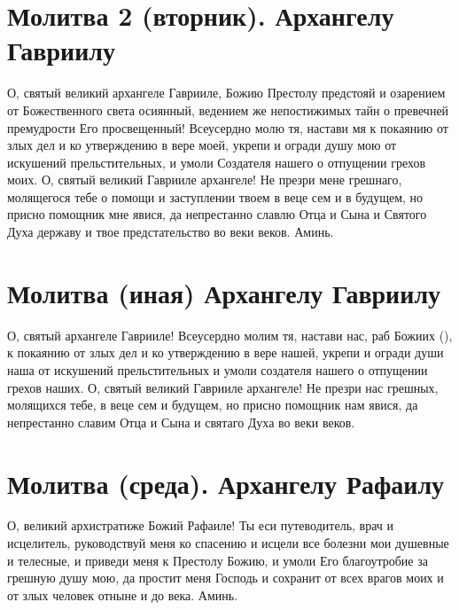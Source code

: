 \section{Молитва 2 (вторник).    Архангелу Гавриилу}\begin{mymulticols}
 


О, святый великий архангеле Гаврииле, Божию Престолу предстояй и озарением от Божественного света осиянный, ведением же непостижимых тайн о превечней премудрости Его просвещенный! Всеусердно молю тя, настави мя к покаянию от злых дел и ко утверждению в вере моей, укрепи и огради душу мою от искушений прельстительных, и умоли Создателя нашего о отпущении грехов моих. О, святый великий Гаврииле архангеле! Не презри мене грешнаго, молящегося тебе о помощи и заступлении твоем в веце сем и в будущем, но присно помощник мне явися, да непрестанно славлю Отца и Сына и Святого Духа державу и твое предстательство во веки веков. Аминь.


\end{mymulticols}

\section{Молитва (иная) Архангелу Гавриилу}\begin{mymulticols}
 


О, святый архангеле Гаврииле! Всеусердно молим тя, настави нас, раб Божиих (), к покаянию от злых дел и ко утверждению в вере нашей, укрепи и огради души наша от искушений прельстительных и умоли создателя нашего о отпущении грехов наших. О, святый великий Гаврииле архангеле! Не презри нас грешных, молящихся тебе, в веце сем и будущем, но присно помощник нам явися, да непрестанно славим Отца и Сына и святаго Духа во веки веков.

\end{mymulticols}

\mychapterending



 

\section{Молитва (среда).     Архангелу Рафаилу}\begin{mymulticols}
 


О, великий архистратиже Божий Рафаиле! Ты еси путеводитель, врач и исцелитель, руководствуй меня ко спасению и исцели все болезни мои душевные и телесные, и приведи меня к Престолу Божию, и умоли Его благоутробие за грешную душу мою, да простит меня Господь и сохранит от всех врагов моих и от злых человек отныне и до века. Аминь.

\end{mymulticols}

